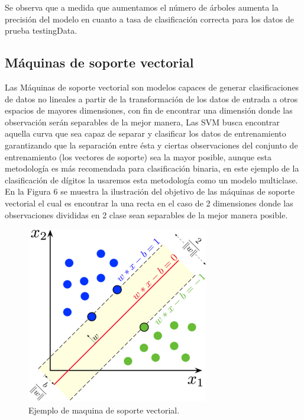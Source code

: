 \documentclass{article}
\begin{document}
Se observa que a medida que aumentamos el número de árboles aumenta la precisión del modelo en cuanto a tasa de clasificación correcta para los datos de prueba testingData. 




\subsection{Máquinas de soporte vectorial}

Las Máquinas de soporte vectorial son modelos capaces de generar clasificaciones de datos no lineales a partir de la transformación de los datos de entrada a otros espacios de mayores dimensiones, con fin de encontrar una dimensión donde las observación serán separables de la mejor manera, Las SVM busca encontrar aquella curva que sea capaz de separar y clasificar los datos de entrenamiento garantizando que la separación entre ésta y ciertas observaciones del conjunto de entrenamiento (los vectores de soporte) sea la mayor posible, aunque esta metodología es más recomendada para clasificación binaria, en este ejemplo de la clasificación de dígitos la usaremos esta metodología como un modelo multiclase.\\

En la Figura 6 se muestra la ilustración del objetivo de las máquinas de soporte vectorial el cual es encontrar la una recta en el caso de 2 dimensiones donde las observaciones divididas en 2 clase sean separables de la mejor manera posible.

\begin{figure}[H]
    \centering
	\includegraphics[scale=2.9]{figure/svm.png}
	\caption{Ejemplo de maquina de soporte vectorial.}
\end{figure}
\end{document}
